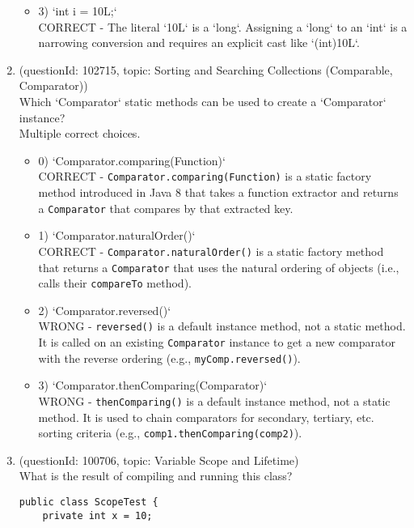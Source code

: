 \documentclass[12pt]{article}
\begin{document}
\begin{enumerate}[label=(\arabic*)]
\begin{itemize}
\item 3) `int i = 10L;`
 \\ 
CORRECT - The literal `10L` is a `long`. Assigning a `long` to an `int` is a narrowing conversion and requires an explicit cast like `(int)10L`.

\end{itemize}
\item (questionId: 102715, topic: Sorting and Searching Collections (Comparable, Comparator)) \\ 
Which `Comparator` static methods can be used to create a `Comparator` instance?
\\ \noindent Multiple correct choices. 
\begin{itemize}
\item 0) `Comparator.comparing(Function)`
 \\ 
CORRECT - \verb|Comparator.comparing(Function)| is a static factory method introduced in Java 8 that takes a function extractor and returns a \verb|Comparator| that compares by that extracted key.

\item 1) `Comparator.naturalOrder()`
 \\ 
CORRECT - \verb|Comparator.naturalOrder()| is a static factory method that returns a \verb|Comparator| that uses the natural ordering of objects (i.e., calls their \verb|compareTo| method).

\item 2) `Comparator.reversed()`
 \\ 
WRONG - \verb|reversed()| is a default instance method, not a static method. It is called on an existing \verb|Comparator| instance to get a new comparator with the reverse ordering (e.g., \verb|myComp.reversed()|).

\item 3) `Comparator.thenComparing(Comparator)`
 \\ 
WRONG - \verb|thenComparing()| is a default instance method, not a static method. It is used to chain comparators for secondary, tertiary, etc. sorting criteria (e.g., \verb|comp1.thenComparing(comp2)|).

\end{itemize}
\item (questionId: 100706, topic: Variable Scope and Lifetime) \\ 
What is the result of compiling and running this class?\n\begin{verbatim}
public class ScopeTest {
    private int x = 10;


\end{verbatim}
\end{enumerate}
\end{document}

